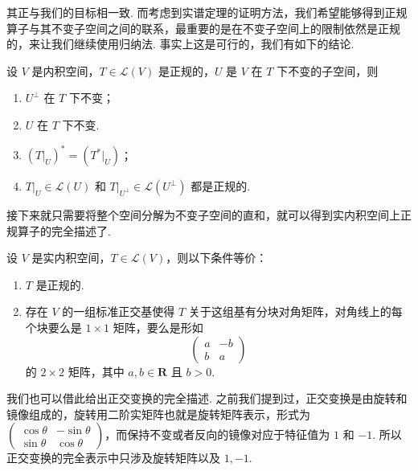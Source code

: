其正与我们的目标相一致. 而考虑到实谱定理的证明方法，我们希望能够得到正规算子与其不变子空间之间的联系，最重要的是在不变子空间上的限制依然是正规的，来让我们继续使用归纳法. 事实上这是可行的，我们有如下的结论.

\begin{theorem}{}{}
    设 $ V $ 是内积空间，$ T \in \mathcal{L}(V) $ 是正规的，$ U $ 是 $ V $ 在 $ T $ 下不变的子空间，则
    \begin{enumerate}
        \item $ U^{\perp} $ 在 $ T $ 下不变；

        \item $ U $ 在 $ T $ 下不变.

        \item $ (T|_U)^* = (T^*|_U) $；

        \item $ T|_U \in \mathcal{L}(U) $ 和 $ T|_{U^{\perp }} \in \mathcal{L}(U^{\perp }) $ 都是正规的.
    \end{enumerate}
\end{theorem}

接下来就只需要将整个空间分解为不变子空间的直和，就可以得到实内积空间上正规算子的完全描述了.

\begin{theorem}{}{}
    设 $ V $ 是实内积空间，$ T \in \mathcal{L}(V) $，则以下条件等价：
    \begin{enumerate}
        \item $ T $ 是正规的.

        \item 存在 $ V $ 的一组标准正交基使得 $ T $ 关于这组基有分块对角矩阵，对角线上的每个块要么是 $ 1 \times 1 $ 矩阵，要么是形如
              \[
                  \begin{pmatrix}
                      a & -b \\
                      b & a
                  \end{pmatrix}
              \]
              的 $ 2 \times 2 $ 矩阵，其中 $ a, b \in \mathbf{R} $ 且 $ b > 0 $.
    \end{enumerate}
\end{theorem}

我们也可以借此给出正交变换的完全描述. 之前我们提到过，正交变换是由旋转和镜像组成的，旋转用二阶实矩阵也就是旋转矩阵表示，形式为 $ \begin{pmatrix} \cos \theta & -\sin \theta \\ \sin \theta & \cos \theta \end{pmatrix} $，而保持不变或者反向的镜像对应于特征值为 $ 1 $ 和 $ -1 $. 所以正交变换的完全表示中只涉及旋转矩阵以及 $ 1, -1 $.

